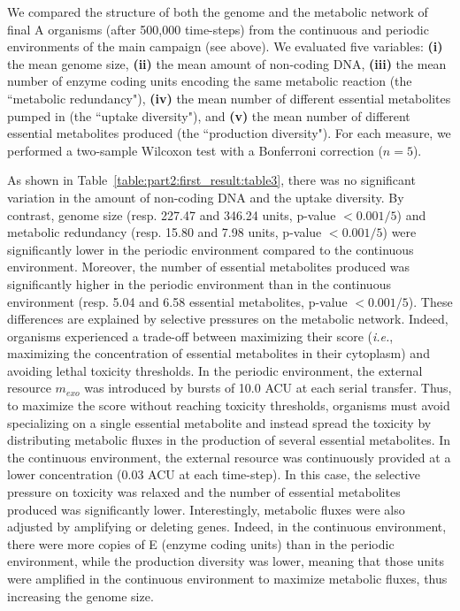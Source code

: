 We compared the structure of both the genome and the metabolic network of final A organisms (after 500,000 time-steps) from the continuous and periodic environments of the main campaign (see above). We evaluated five variables: \textbf{(i)} the mean genome size, \textbf{(ii)} the mean amount of non-coding DNA, \textbf{(iii)} the mean number of enzyme coding units encoding the same metabolic reaction (the ``metabolic redundancy"), \textbf{(iv)} the mean number of different essential metabolites pumped in (the ``uptake diversity"), and \textbf{(v)} the mean number of different essential metabolites produced (the ``production diversity"). For each measure, we performed a two-sample Wilcoxon test with a Bonferroni correction ($n=5$).

As shown in Table~\ref{table:part2:first_result:table3}, there was no significant variation in the amount of non-coding DNA and the uptake diversity. By contrast, genome size (resp. 227.47 and 346.24 units, p-value $< 0.001/5$) and metabolic redundancy (resp. 15.80 and 7.98 units, p-value $< 0.001/5$) were significantly lower in the periodic environment compared to the continuous environment. Moreover, the number of essential metabolites produced was significantly higher in the periodic environment than in the continuous environment (resp. 5.04 and 6.58 essential metabolites, p-value $< 0.001/5$).
These differences are explained by selective pressures on the metabolic network. Indeed, organisms experienced a trade-off between maximizing their score (\textit{i.e.}, maximizing the concentration of essential metabolites in their cytoplasm) and avoiding lethal toxicity thresholds. In the periodic environment, the external resource $m_{exo}$ was introduced by bursts of 10.0 ACU at each serial transfer. Thus, to maximize the score without reaching toxicity thresholds, organisms must avoid specializing on a single essential metabolite and instead spread the toxicity by distributing metabolic fluxes in the production of several essential metabolites. In the continuous environment, the external resource was continuously provided at a lower concentration (0.03 ACU at each time-step). In this case, the selective pressure on toxicity was relaxed and the number of essential metabolites produced was significantly lower. Interestingly, metabolic fluxes were also adjusted by amplifying or deleting genes. Indeed, in the continuous environment, there were more copies of E (enzyme coding units) than in the periodic environment, while the production diversity was lower, meaning that those units were amplified in the continuous environment to maximize metabolic fluxes, thus increasing the genome size.

